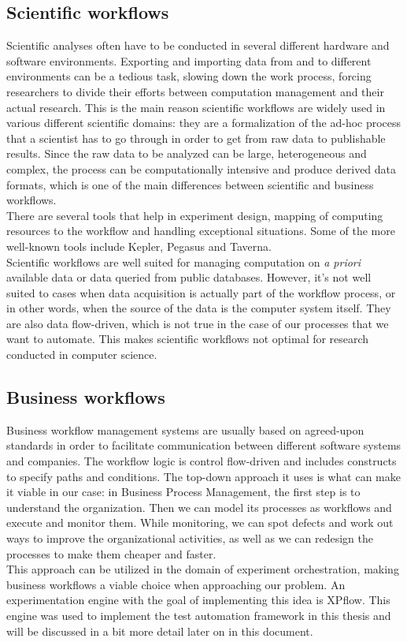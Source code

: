 \subsection{Scientific workflows}
Scientific analyses often have to be conducted in several different
hardware and software environments. Exporting and importing data from
and to different environments can be a tedious task, slowing down the
work process, forcing researchers to divide their efforts between
computation management and their actual research. This is the main
reason scientific workflows are widely used in various different
scientific domains: they are a formalization of the ad-hoc
process that a scientist has to go through in order to get from raw
data to publishable results. Since the raw data to be analyzed can be
large, heterogeneous and complex, the process can be computationally
intensive and produce derived data formats, which is one of the main
differences between scientific and business
workflows.\cite{abjjlm04}\\
There are several tools that help in experiment design, mapping of
computing resources to the workflow and handling exceptional
situations. Some of the more well-known tools include
Kepler\cite{abjjlm04}, Pegasus\cite{dssbgkmvbgljk05} and
Taverna\cite{whfwwsdnfbbbhnvsg13}.\\
Scientific workflows are well suited for managing computation on
\emph{a priori} available data or data queried from public
databases. However, it's not well suited to cases when data
acquisition is actually part of the workflow process, or in other
words, when the source of the data is the computer system
itself. They are also data flow-driven, which is not true in the case
of our processes that we want to automate. This makes scientific
workflows not optimal for research conducted in computer science.
\subsection{Business workflows}
Business workflow management systems are usually based on agreed-upon
standards in order to facilitate communication between different
software systems and companies. The workflow logic is control
flow-driven and includes constructs to specify paths and
conditions.\cite{skd10} The top-down approach it uses is what can make
it viable in our case: in Business Process Management, the first step
is to understand the organization. Then we can model its processes as
workflows and execute and monitor them. While monitoring,
we can spot defects and work out ways to improve the organizational
activities, as well as we can redesign the processes to make them
cheaper and faster.\cite{bn12_2}\\
This approach can be utilized in the domain of experiment
orchestration, making business workflows a viable choice when
approaching our problem. An experimentation engine with the goal of
implementing this idea is XPflow\cite{bn12_2}. This engine was used to
implement the test automation framework in this thesis and will be
discussed in a bit more detail later on in this document.
